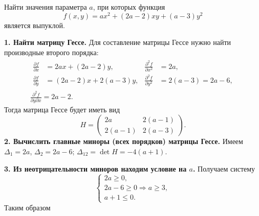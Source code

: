 \begin{example}
  Найти значения параметра $ a $, при которых функция 
  \[
      f(x, y) = ax^2 + (2a-2)xy + (a-3)y^2
  \]
  является выпуклой.
  \begin{solution}
    \textbf{1. Найти матрицу Гессе.} Для составление матрицы Гессе нужно найти
    производные второго порядка: 
    \begin{gather*}
    \begin{aligned}
      \frac{\partial f}{\partial x} &= 2ax + (2a-2)y, & \frac{\partial^2
      f}{\partial x^2} &=2a, \\
      \frac{\partial f}{\partial y} &= (2a-2)x + 2(a-3) y, & \frac{\partial^2
      f}{\partial y^2} &= 2(a-3) = 2a - 6,
    \end{aligned} \\ 
    \frac{\partial^2 f}{\partial y \partial x} = 2a -2.
  \end{gather*}
  Тогда матрица Гессе будет иметь вид 
  \[
      H = \begin{pmatrix}
        2a & 2(a-1) \\
        2(a-1) & 2(a-3)
      \end{pmatrix}.
  \]
  \textbf{2. Вычислить главные миноры (всех порядков) матрицы Гессе.} Имеем $
  \Delta_1 = 2a $, $ \Delta_2 = 2a -6 $; $ \Delta_{12} = \det H = -4(a+1) $.

  \textbf{3. Из неотрицательности миноров находим условие на $ a $.} Получаем
  систему  
  \[
      \begin{cases}
        2a \geqslant 0, \\
        2a - 6 \geqslant 0 \Rightarrow a \geqslant 3, \\
        a + 1 \leqslant 0.
      \end{cases}
  \]
  Таким образом  
    
  \end{solution}
\end{example}
